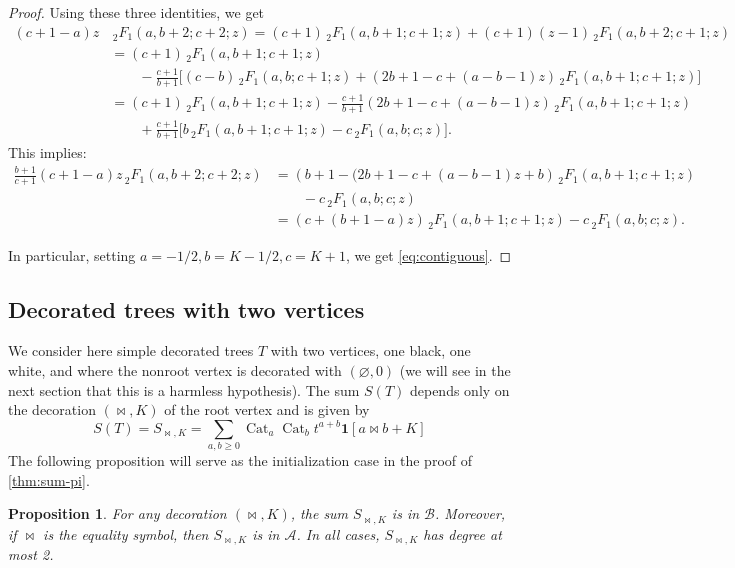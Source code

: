\documentclass[12pt]{amsart}
\theoremstyle{plain}
\newtheorem{proposition}[lemma]{Proposition}
\theoremstyle{remark}
\def\One{\bm{1}}
\DeclareMathOperator{\Cat}{Cat}
\def\cA{\mathcal{A}}
\def\cB{\mathcal{B}}
\begin{document}
\begin{proof}
Using these three identities, we get
\begin{align*}
(c+1-a)z &\,{}_{2}^{}{{}{{}{F_{1}^{}}}}(a,b+2;c+2;z) =  (c+1)\, {}_{2}^{}{{}{{}{F_{1}^{}}}}(a,b+1;c+1;z) + (c+1)(z-1) \,{}_{2}^{}{{}{{}{F_{1}^{}}}}(a,b+2;c+1;z)\\
&= (c+1)\, {}_{2}^{}{{}{{}{F_{1}^{}}}}(a,b+1;c+1;z) \\ &\qquad - \frac{c+1}{b+1} \big[ (c-b)\,{}_{2}^{}{{}{{}{F_{1}^{}}}}(a,b;c+1;z) + (2b+1-c+(a-b-1)z)\,{}_{2}^{}{{}{{}{F_{1}^{}}}}(a,b+1;c+1;z) \big]\\
&=(c+1) \,{}_{2}^{}{{}{{}{F_{1}^{}}}}(a,b+1;c+1;z) - \frac{c+1}{b+1} (2b+1-c+(a-b-1)z)\,{}_{2}^{}{{}{{}{F_{1}^{}}}}(a,b+1;c+1;z) \\ & \qquad +\frac{c+1}{b+1} \big[ b\,{}_{2}^{}{{}{{}{F_{1}^{}}}}(a,b+1;c+1;z)-c\,{}_{2}^{}{{}{{}{F_{1}^{}}}}(a,b;c;z)\big].
\end{align*}
This implies:
\begin{align*}
\frac{b+1}{c+1}(c+1-a)z\,{}_{2}^{}{{}{{}{F_{1}^{}}}}(a,b+2;c+2;z) &= \left( b+1 - (2b+1-c + (a-b-1)z +b \right)\, {}_{2}^{}{{}{{}{F_{1}^{}}}}(a,b+1;c+1;z) \\ & \qquad -c\,{}_{2}^{}{{}{{}{F_{1}^{}}}}(a,b;c;z)\\
&= \left(c+(b+1-a)z\right)\,{}_{2}^{}{{}{{}{F_{1}^{}}}}(a,b+1;c+1;z) -c\,{}_{2}^{}{{}{{}{F_{1}^{}}}}(a,b;c;z).
\end{align*}

In particular, setting $a=-1/2,b=K-1/2,c=K+1$, we get \eqref{eq:contiguous}.
\end{proof}




\subsection{Decorated trees with two vertices}
\label{ssec:base_case}
We consider here simple decorated trees $T$ with two vertices, one black, one white, and where the nonroot
vertex is decorated with $(\varnothing,0)$ (we will see in the next section
that this is a harmless hypothesis). The sum $S(T)$ depends only on the decoration $(\bowtie,K)$
of the root vertex and is given by 
\[S(T)=S_{\bowtie,K} = \sum_{a, b \geq 0} \Cat_a \Cat_b t^{a+b} \One[a \bowtie b+K] \]
The following proposition
 will serve as the initialization case in the proof of \cref{thm:sum-pi}.
\begin{proposition}
\label{prop:basecase}
For any decoration $(\bowtie,K)$, the sum
$
S_{\bowtie,K} 
$ is in $\cB$. Moreover, if $\bowtie$ is the equality symbol, then 
$
S_{\bowtie,K} 
$ is in $\cA$. In all cases, $
S_{\bowtie,K} 
$ has degree at most 2.
\end{proposition}
\end{document}
